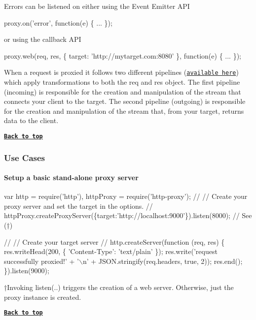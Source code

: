 Errors can be listened on either using the Event Emitter A\+PI


\begin{DoxyCode}
proxy.on('error', function(e) \{
  ...
\});
\end{DoxyCode}


or using the callback A\+PI


\begin{DoxyCode}
proxy.web(req, res, \{ target: 'http://mytarget.com:8080' \}, function(e) \{ ... \});
\end{DoxyCode}


When a request is proxied it follows two different pipelines (\href{lib/http-proxy/passes}{\tt available here}) which apply transformations to both the {\ttfamily req} and {\ttfamily res} object. The first pipeline (incoming) is responsible for the creation and manipulation of the stream that connects your client to the target. The second pipeline (outgoing) is responsible for the creation and manipulation of the stream that, from your target, returns data to the client.

{\bfseries \href{#table-of-contents}{\tt Back to top}}

\subsubsection*{Use Cases}

\paragraph*{Setup a basic stand-\/alone proxy server}


\begin{DoxyCode}
var http = require('http'),
    httpProxy = require('http-proxy');
//
// Create your proxy server and set the target in the options.
//
httpProxy.createProxyServer(\{target:'http://localhost:9000'\}).listen(8000); // See (†)

//
// Create your target server
//
http.createServer(function (req, res) \{
  res.writeHead(200, \{ 'Content-Type': 'text/plain' \});
  res.write('request successfully proxied!' + '\(\backslash\)n' + JSON.stringify(req.headers, true, 2));
  res.end();
\}).listen(9000);
\end{DoxyCode}
 †\+Invoking listen(..) triggers the creation of a web server. Otherwise, just the proxy instance is created.

{\bfseries \href{#table-of-contents}{\tt Back to top}}

